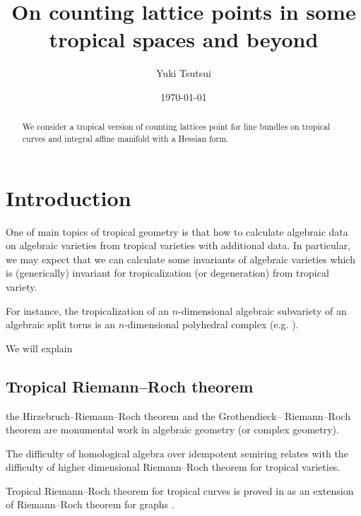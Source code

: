 \documentclass[a4paper,dvipdfmx,reqno,12pt]{amsart}
\title{On counting lattice points in some tropical spaces and beyond
}
\author[Y. Tsutsui]{Yuki Tsutsui}
\date{\today}
\theoremstyle{definition}
\numberwithin{equation}{section}
\begin{document}
\begin{abstract}
We consider a tropical version of counting lattices point for 
line bundles on tropical curves and integral affine manifold
with a Hessian form.
\end{abstract}
\maketitle
\section{Introduction}

One of main topics of tropical geometry is that 
how to calculate algebraic data on algebraic varieties
from tropical varieties with additional data.
In particular, we may expect that we can calculate
 some invariants of algebraic varieties
which is (generically) invariant for tropicalization
(or degeneration) from tropical variety.

For instance, the tropicalization of an $n$-dimensional
algebraic subvariety of an algebraic split torus 
is an $n$-dimensional polyhedral complex 
(e.g. 
\cite[Theorem 3.2.3]{maclaganIntroductionTropicalGeometry2015a}).

We will explain 

\subsection{Tropical Riemann--Roch theorem}

the Hirzebruch--Riemann--Roch theorem and the Grothendieck--
Riemann--Roch theorem are monumental work in
 algebraic geometry (or complex geometry).

The difficulty of homological algebra over idempotent 
semiring relates 
with the difficulty of higher dimensional
Riemann--Roch theorem for 
tropical varieties.

Tropical Riemann--Roch theorem for tropical curves 
is proved in \cite{gathmannRiemannRochTheoremTropical2008a}
as an extension of Riemann--Roch theorem for graphs 
\cite{MR2355607}.
\end{document}
